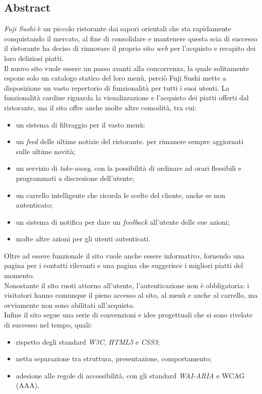 \documentclass{template}
\begin{document}
	\subsection{Abstract}
    \textit{Fuji Sushi} è un piccolo ristorante dai sapori orientali che sta rapidamente conquistando il mercato, al fine di consolidare e mantenere questa scia di successo il ristorante ha deciso di rinnovare il proprio sito \textit{web} per l'acquisto e recapito dei loro deliziosi piatti. \\
    Il nuovo sito vuole essere un passo avanti alla concorrenza, la quale solitamente espone solo un catalogo statico del loro menù, perciò Fuji Sushi mette a disposizione un vasto repertorio di funzionalità per tutti i suoi utenti.
    La funzionalità cardine riguarda la visualizzazione e l'acquisto dei piatti offerti dal ristorante, ma il sito offre anche molte altre comodità, tra cui:
    \begin{itemize}
        \item un sistema di filtraggio per il vasto menù;
        \item un \textit{feed} delle ultime notizie del ristorante. per rimanere sempre aggiornati sulle ultime novità;
        \item un servizio di \textit{take-away}, con la possibilità di ordinare ad orari flessibili e programmati a discrezione dell'utente;
        \item un carrello intelligente che ricorda le scelte del cliente, anche se non autenticato;
        \item un sistema di notifica per dare un \textit{feedback} all'utente delle sue azioni;
        \item molte altre azioni per gli utenti autenticati.
    \end{itemize}
    Oltre ad essere funzionale il sito vuole anche essere informativo, fornendo una pagina per i contatti rilevanti e una pagina che suggerisce i migliori piatti del momento. \\
    Nonostante il sito ruoti attorno all'utente, l'autenticazione non è obbligatoria: i visitatori hanno comunque il pieno accesso al sito, al menù e anche al carrello, ma ovviamente non sono abilitati all'acquisto. \\
    Infine il sito segue una serie di convenzioni e idee progettuali che si sono rivelate di successo nel tempo, quali:
    \begin{itemize}
        \item rispetto degli standard \textit{W3C}, \textit{HTML5} e \textit{CSS3};
        \item netta separazione tra struttura, presentazione, comportamento;
        \item adesione alle regole di accessibilità, con gli standard \textit{WAI-ARIA} e WCAG (AAA).
    \end{itemize}
\end{document}
